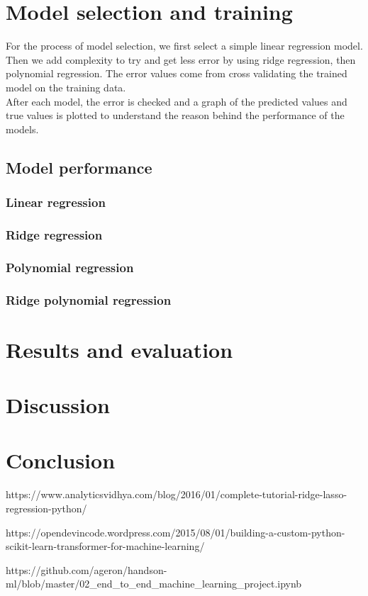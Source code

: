 \documentclass{article}
\newcommand{\n}[0]{\\[\baselineskip]}
\begin{document}
\section{Model selection and training}
For the process of model selection, we first select a simple linear regression model. Then we add complexity to try and get less error by using ridge regression, then polynomial regression. The error values come from cross validating the trained model on the training data.
\n
After each model, the error is checked and a graph of the predicted values and true values is plotted to understand the reason behind the performance of the models.


\subsection{Model performance}

\subsubsection{Linear regression}


\subsubsection{Ridge regression}

\subsubsection{Polynomial regression}


\subsubsection{Ridge polynomial regression}

\section{Results and evaluation}

\section{Discussion}

\section{Conclusion}

https://www.analyticsvidhya.com/blog/2016/01/complete-tutorial-ridge-lasso-regression-python/

https://opendevincode.wordpress.com/2015/08/01/building-a-custom-python-scikit-learn-transformer-for-machine-learning/

https://github.com/ageron/handson-ml/blob/master/02_end_to_end_machine_learning_project.ipynb

\printbibliography
\end{document}
